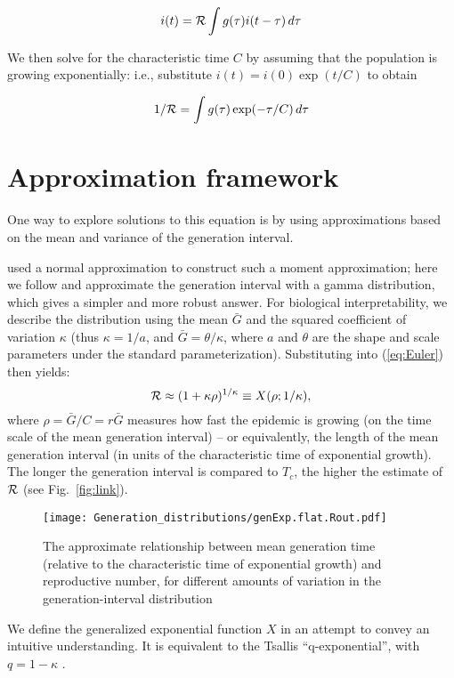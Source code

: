 \documentclass[12pt,]{article}
\newcommand{\RR}{\ensuremath{{\cal R}}}
\newcommand{\Tc}{\ensuremath{C}}
\newcommand{\eref}[1]{(\ref{eq:#1})}
\newcommand{\fref}[1]{Fig.~\ref{fig:#1}}
\begin{document}
$$i(t) = \RR\int{g(\tau)i(t-\tau) \,d\tau}$$

We then solve for the characteristic time $\Tc$ by assuming that the population is growing exponentially: i.e., substitute $i(t) = i(0) \exp(t/\Tc)$ to obtain

\begin{equation}
	1/\RR = \int{g(\tau)\exp(-\tau/\Tc) \,d\tau}\label{eq:Euler}
\end{equation}

\section{Approximation framework}

One way to explore solutions to this equation is by using approximations based on the mean and variance of the generation interval.

\cite{WallLips07} used a normal approximation to construct such a moment approximation; here we follow \cite{NishCast09} and approximate the generation interval with a gamma distribution, which gives a simpler and more robust answer.
For biological interpretability, we describe the distribution using the mean $\bar G$ and the squared coefficient of variation $\kappa$ (thus $\kappa = 1/a$, and $\bar G = \theta/\kappa$, where $a$ and $\theta$ are the shape and scale parameters under the standard parameterization).
Substituting into \eref{Euler} then yields:
\begin{equation}
	\RR \approx (1 + \kappa \rho)^{1/\kappa} \equiv X(\rho; 1/\kappa),
	\label{eq:genExp}
\end{equation}
where $\rho = \bar G/\Tc = r\bar G$ measures how fast the epidemic is growing (on the time scale of the mean generation interval) -- or equivalently, the length of the mean generation interval (in units of the characteristic time of exponential growth).
The longer the generation interval is compared to $T_c$, the higher the estimate of $\RR$ (see \fref{link}).

\begin{figure}[htbp]
	\centering \texttt{[image: Generation\_distributions/genExp.flat.Rout.pdf]}
	\caption{
		The approximate relationship between mean generation time (relative to
		the characteristic time of exponential growth) and reproductive number,
		for different amounts of variation in the generation-interval
		distribution
	} \label{fig:genExp} 
\end{figure}
We define the generalized exponential function $X$ in an attempt to convey an intuitive understanding.
It is equivalent to the Tsallis ``q-exponential'', with $q=1-\kappa$ \cite{tsallis1994numbers}.
\end{document}

